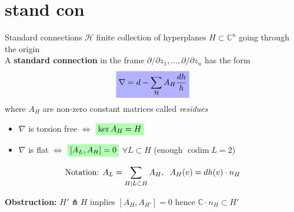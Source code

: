 \documentclass{beamer}
\newcommand{\C}{\mathbb{C}}
\newcommand{\mH}{\mathcal{H}}
\newcommand{\p}{\partial}
\DeclareMathOperator{\codim}{codim}
\newcommand{\mathcolorbox}[2]{\colorbox{#1}{$\displaystyle #2$}}
\begin{document}
\section{stand con}
\begin{frame}{Standard connections}
	\(\mH\) finite collection of hyperplanes
	\(H \subset \C^n\) going through the origin \\
	A \textbf{standard connection} in the frame \(\p/\p z_1, \ldots, \p/ \p z_n\) has the form
	\begin{equation*}
	\mathcolorbox{blue!30}{
		\nabla = d - \sum_{\mH} A_H \frac{dh}{h}
		}
	\end{equation*}
 where \(A_H\) are non-zero constant matrices called \emph{residues}
	
	\begin{itemize}
		\item \(\nabla\) is torsion free \(\iff\) \(\mathcolorbox{green!30}{\ker A_H = H}\)
		\item \(\nabla\) is flat \(\iff\) \(\mathcolorbox{green!30}{[A_L, A_H] = 0}\) \(\forall L \subset H\) (enough \(\codim L=2\))
	\end{itemize}
\[\text{Notation: } A_L = \sum_{H|L \subset H} A_H, \hspace{2mm} A_H(v) = dh(v) \cdot n_H \]

\textbf{Obstruction:} \(H' \pitchfork H\) implies \([A_H, A_{H'}]=0\) hence \(\C \cdot n_H \subset H'\)
\end{frame}
\end{document}
